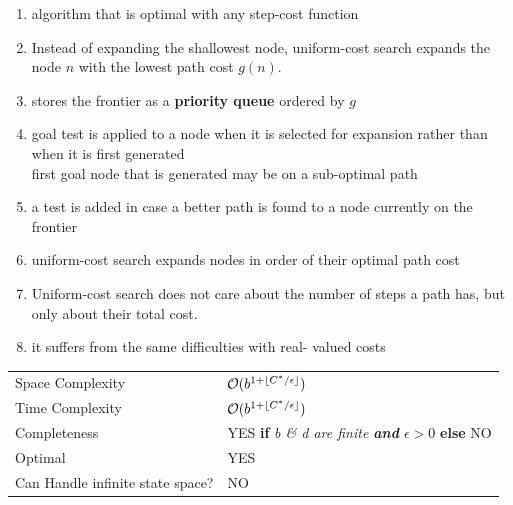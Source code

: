 \begin{enumerate}
    \item algorithm that is optimal with any step-cost function

    \item Instead of expanding the shallowest node, uniform-cost search expands the node $n$ with the lowest path cost $g(n)$.

    \item stores the frontier as a \textbf{priority queue} ordered by $g$

    \item goal test is applied to a node when it is selected for expansion rather than when it is first generated\\
    first goal node that is generated may be on a sub-optimal path

    \item a test is added in case a better path is found to a node currently on the frontier

    \item uniform-cost search expands nodes in order of their optimal path cost

    \item Uniform-cost search does not care about the number of steps a path has, but only about their total cost.

    \item it suffers from the same difficulties with real- valued costs
\end{enumerate}

\vspace{0.5cm}

\begin{customTableWrapper}{1.2}
\begin{longtable}{p{3cm} p{6cm}}
    Space Complexity & $\mathcal{O}(b^{1 + \left \lfloor C^\ast/ \epsilon \right \rfloor})$ \\

    Time Complexity & $\mathcal{O}(b^{1 + \left \lfloor C^\ast/ \epsilon \right \rfloor})$ \\

    \hline
    
    Completeness & YES \textbf{if} \textit{b \& d are finite \textbf{and} $\epsilon > 0$} \textbf{else} NO\\

    Optimal & YES \\

    Can Handle infinite state space? & NO \\
\end{longtable}
\end{customTableWrapper}


